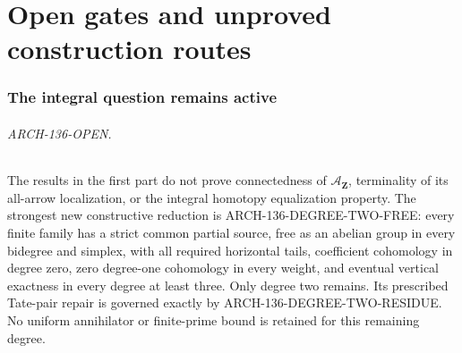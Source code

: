 \documentclass[11pt,a4paper]{article}
\begin{document}




























\clearpage
\part{Open gates and unproved construction routes}
\section{The integral question remains active}
\paragraph{ARCH-136-OPEN.}
The results in the first part do not prove connectedness of
$\mathcal A_{\mathbf Z}$, terminality of its all-arrow localization,
or the integral homotopy equalization property. The strongest new
constructive reduction is ARCH-136-DEGREE-TWO-FREE: every finite family
has a strict common partial source, free as an abelian group in every
bidegree and simplex, with all required horizontal tails, coefficient
cohomology in degree zero, zero degree-one cohomology in every weight,
and eventual vertical exactness in every degree at least three.
Only degree two remains. Its prescribed Tate-pair repair is governed
exactly by ARCH-136-DEGREE-TWO-RESIDUE. No uniform annihilator or
finite-prime bound is retained for this remaining degree.
\end{document}

